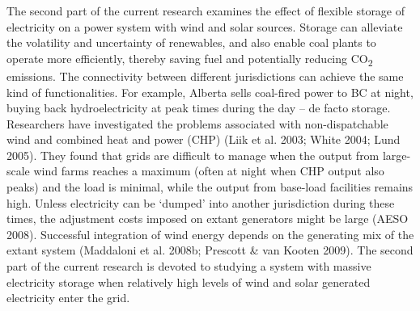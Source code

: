 The second part of the current research examines the effect of flexible
storage of electricity on a power system with wind and solar sources.
Storage can alleviate the volatility and uncertainty of renewables, and
also enable coal plants to operate more efficiently, thereby saving fuel
and potentially reducing CO\textsubscript{2} emissions. The connectivity
between different jurisdictions can achieve the same kind of
functionalities. For example, Alberta sells coal-fired power to BC at
night, buying back hydroelectricity at peak times during the day -- de
facto storage. Researchers have investigated the problems associated
with non-dispatchable wind and combined heat and power (CHP) (Liik et
al. 2003; White 2004; Lund 2005). They found that grids are difficult to
manage when the output from large-scale wind farms reaches a maximum
(often at night when CHP output also peaks) and the load is minimal,
while the output from base-load facilities remains high. Unless
electricity can be `dumped' into another jurisdiction during these
times, the adjustment costs imposed on extant generators might be large
(AESO 2008). Successful integration of wind energy depends on the
generating mix of the extant system (Maddaloni et al. 2008b; Prescott \&
van Kooten 2009). The second part of the current research is devoted to
studying a system with massive electricity storage when relatively high
levels of wind and solar generated electricity enter the grid.

